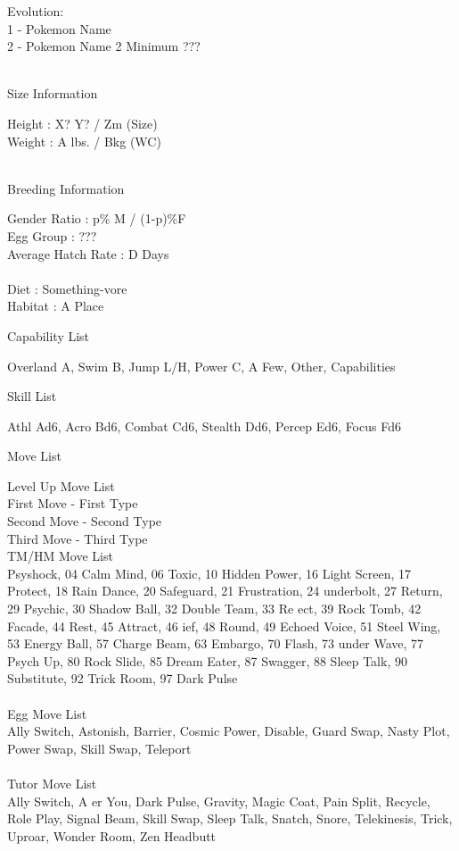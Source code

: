 \documentclass{article}
\begin{document}
\begin{multicols}{2}
\noindent Evolution:\\
1 - Pokemon Name\\
2 - Pokemon Name 2 Minimum ???
\\\\
\begin{center}Size Information\end{center}
Height : X? Y? / Zm (Size)\\
Weight : A lbs. / Bkg (WC)
\\\\
\begin{center}Breeding Information\end{center}
Gender Ratio : p\% M / (1-p)\%F\\
Egg Group : ???\\
Average Hatch Rate : D Days
\\\\
\noindent Diet : Something-vore\\
Habitat : A Place
\vfill\null
\columnbreak
\begin{center}Capability List\end{center}
Overland A, Swim B, Jump L/H, Power C, A Few, Other, Capabilities

\begin{center}Skill List\end{center}
Athl Ad6, Acro Bd6, Combat Cd6, Stealth Dd6, Percep Ed6, Focus Fd6

\begin{center}Move List\end{center}
Level Up Move List\\
\indent{} First Move - First Type\\
\indent{} Second Move - Second Type\\
\indent{} Third Move - Third Type\\

\noindent TM/HM Move List\\
\indent{} Psyshock, 04 Calm Mind, 06 Toxic, 10
Hidden Power, 16 Light Screen, 17 Protect, 18 Rain Dance, 20 Safeguard, 21 Frustration, 24  underbolt, 27 Return, 29 Psychic, 30 Shadow Ball, 32 Double Team, 33 Re ect, 39 Rock Tomb, 42 Facade, 44 Rest, 45 Attract, 46  ief, 48 Round, 49 Echoed Voice,
51 Steel Wing, 53 Energy Ball, 57 Charge Beam, 63 Embargo, 70 Flash, 73  under Wave, 77 Psych Up, 80 Rock Slide, 85 Dream Eater, 87 Swagger, 88 Sleep Talk, 90 Substitute, 92 Trick Room, 97 Dark Pulse
\\\\
Egg Move List\\
\indent\indent Ally Switch, Astonish, Barrier, Cosmic Power,
Disable, Guard Swap, Nasty Plot, Power Swap, Skill Swap, Teleport
\\\\
Tutor Move List\\
\indent\indent Ally Switch, A er You, Dark Pulse, Gravity, Magic Coat, Pain Split, Recycle, Role Play, Signal Beam, Skill Swap, Sleep Talk, Snatch, Snore, Telekinesis, Trick, Uproar, Wonder Room, Zen Headbutt
\end{multicols}
\end{document}
